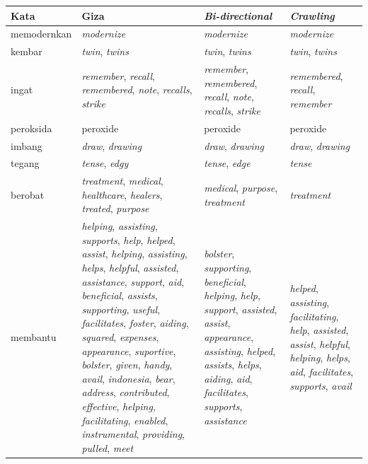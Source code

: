 	\begin{longtable}{|p{3cm}|p{3cm}|p{3cm}|p{3cm}|}
		\hline
		\textbf{Kata} & \textbf{Giza} & \textbf{\textit{Bi-directional}} & \textbf{\textit{Crawling}}
		\\ \hline
		memodernkan & \textit{modernize} & \textit{modernize} & \textit{modernize} \\ \hline
		kembar & \textit{twin}, \textit{twins} & \textit{twin}, \textit{twins} & \textit{twin}, \textit{twins} \\ \hline
		ingat & \textit{remember}, \textit{recall}, \textit{remembered}, \textit{note}, \textit{recalls}, \textit{strike} & \textit{remember}, \textit{remembered}, \textit{recall}, \textit{note}, \textit{recalls}, \textit{strike} & \textit{remembered}, \textit{recall}, \textit{remember} \\ \hline
		peroksida & peroxide & peroxide & peroxide \\ \hline
		imbang & \textit{draw}, \textit{drawing} & \textit{draw}, \textit{drawing} & \textit{draw}, \textit{drawing} \\ \hline
		tegang & \textit{tense}, \textit{edgy} & \textit{tense}, \textit{edge} & \textit{tense} \\ \hline
		berobat & \textit{treatment}, \textit{medical}, \textit{healthcare}, \textit{healers}, \textit{treated}, \textit{purpose} & \textit{medical}, \textit{purpose}, \textit{treatment} & \textit{treatment} \\ \hline
		membantu & \textit{helping}, \textit{assisting}, \textit{supports}, \textit{help}, \textit{helped}, \textit{assist}, \textit{helping}, \textit{assisting}, \textit{helps}, \textit{helpful}, \textit{assisted}, \textit{assistance}, \textit{support}, \textit{aid}, \textit{beneficial}, \textit{assists}, \textit{supporting}, \textit{useful}, \textit{facilitates}, \textit{foster}, \textit{aiding}, \textit{squared}, \textit{expenses}, \textit{appearance}, \textit{suportive}, \textit{bolster}, \textit{given}, \textit{handy}, \textit{avail}, \textit{indonesia}, \textit{bear}, \textit{address}, \textit{contributed}, \textit{effective}, \textit{helping}, \textit{facilitating}, \textit{enabled}, \textit{instrumental}, \textit{providing}, \textit{pulled}, \textit{meet} & \textit{bolster}, \textit{supporting}, \textit{beneficial}, \textit{helping}, \textit{help}, \textit{support}, \textit{assisted}, \textit{assist}, \textit{appearance}, \textit{assisting}, \textit{helped}, \textit{assists}, \textit{helps}, \textit{aiding}, \textit{aid}, \textit{facilitates}, \textit{supports}, \textit{assistance} & \textit{helped}, \textit{assisting}, \textit{facilitating}, \textit{help}, \textit{assisted}, \textit{assist}, \textit{helpful}, \textit{helping}, \textit{helps}, \textit{aid}, \textit{facilitates}, \textit{supports}, \textit{avail} \\ \hline

\end{longtable}
